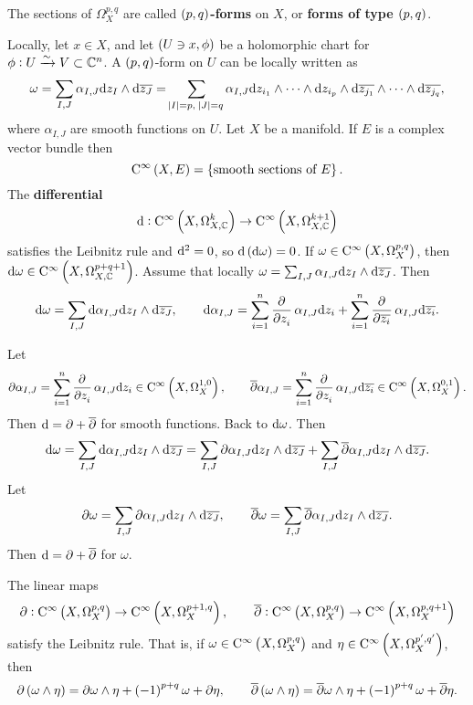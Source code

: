 \begin{definition}
The sections of $ \Omega_X^{p, q} $ are called \textbf{$ \br{p, q} $-forms} on $ X $, or \textbf{forms of type $ \br{p, q} $}.
\end{definition}

Locally, let $ x \in X $, and let $ \br{U \ni x, \phi} $ be a holomorphic chart for $ \phi : U \xrightarrow{\sim} V \subset \mathbb{C}^n $. A $ \br{p, q} $-form on $ U $ can be locally written as
$$ \omega = \sum_{I, J} \alpha_{I, J} \d z_I \wedge \d\overline{z_J} = \sum_{\abs{I} = p, \ \abs{J} = q} \alpha_{I, J} \d z_{i_1} \wedge \dots \wedge \d z_{i_p} \wedge \d\overline{z_{j_1}} \wedge \dots \wedge \d\overline{z_{j_q}}, $$
where $ \alpha_{I, J} $ are smooth functions on $ U $. Let $ X $ be a manifold. If $ E $ is a complex vector bundle then
$$ \C^\infty\br{X, E} = \cbr{\text{smooth sections of} \ E}. $$
The \textbf{differential}
$$ \d : \C^\infty\br{X, \Omega_{X, \CC}^k} \to \C^\infty\br{X, \Omega_{X, \CC}^{k + 1}} $$
satisfies the Leibnitz rule and $ \mathrm{d}^2 = 0 $, so $ \d\br{\d\omega} = 0 $. If $ \omega \in \C^\infty\br{X, \Omega_X^{p, q}} $, then $ \d\omega \in \C^\infty\br{X, \Omega_{X, \CC}^{p + q + 1}} $. Assume that locally $ \omega = \sum_{I, J} \alpha_{I, J} \mathrm{d} z_I \wedge \mathrm{d}\overline{z_J} $. Then
$$ \d\omega = \sum_{I, J} \d\alpha_{I, J} \d z_I \wedge \d\overline{z_J}, \qquad \d\alpha_{I, J} = \sum_{i = 1}^n \dpd{}{z_i}\alpha_{I, J} \d z_i + \sum_{i = 1}^n \dpd{}{\overline{z_i}}\alpha_{I, J} \d\overline{z_i}. $$

\pagebreak

Let
$$ \partial\alpha_{I, J} = \sum_{i = 1}^n \dpd{}{z_i}\alpha_{I, J} \d z_i \in \C^\infty\br{X, \Omega_X^{1, 0}}, \qquad \overline{\partial}\alpha_{I, J} = \sum_{i = 1}^n \dpd{}{z_i}\alpha_{I, J} \d\overline{z_i} \in \C^\infty\br{X, \Omega_X^{0, 1}}. $$
Then $ \mathrm{d} = \partial + \overline{\partial} $ for smooth functions. Back to $ \mathrm{d}\omega $. Then
$$ \mathrm{d}\omega = \sum_{I, J} \mathrm{d}\alpha_{I, J} \mathrm{d} z_I \wedge \mathrm{d}\overline{z_J} = \sum_{I, J} \partial\alpha_{I, J} \mathrm{d} z_I \wedge \mathrm{d}\overline{z_J} + \sum_{I, J} \overline{\partial}\alpha_{I, J} \mathrm{d} z_I \wedge \mathrm{d}\overline{z_J}. $$
Let
$$ \partial\omega = \sum_{I, J} \partial\alpha_{I, J} \mathrm{d} z_I \wedge \mathrm{d}\overline{z_J}, \qquad \overline{\partial}\omega = \sum_{I, J} \overline{\partial}\alpha_{I, J} \mathrm{d} z_I \wedge \mathrm{d}\overline{z_J}. $$
Then $ \mathrm{d} = \partial + \overline{\partial} $ for $ \omega $.

\begin{lemma}
The linear maps
$$ \partial : \C^\infty\br{X, \Omega_X^{p, q}} \to \C^\infty\br{X, \Omega_X^{p + 1, q}}, \qquad \overline{\partial} : \C^\infty\br{X, \Omega_X^{p, q}} \to \C^\infty\br{X, \Omega_X^{p, q + 1}} $$
satisfy the Leibnitz rule. That is, if $ \omega \in \C^\infty\br{X, \Omega_X^{p, q}} $ and $ \eta \in \C^\infty\br{X, \Omega_X^{p', q'}} $, then
$$ \partial\br{\omega \wedge \eta} = \partial\omega \wedge \eta + \br{-1}^{p + q}\omega + \partial\eta, \qquad \overline{\partial}\br{\omega \wedge \eta} = \overline{\partial}\omega \wedge \eta + \br{-1}^{p + q}\omega + \overline{\partial}\eta. $$
\end{lemma}

